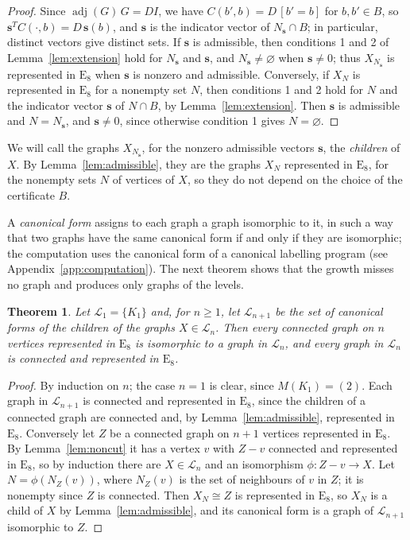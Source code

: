 \documentclass[11pt]{article}
\newcommand\cL{{\mathcal L}}
\newtheorem{theorem}{Theorem}[section]
\theoremstyle{definition}
\newcommand{\typ}[1]{\mathrm{#1}}
\newcommand\Zs{{\mathbf s}}
\begin{document}
\begin{proof}
Since $\operatorname{adj}(G)\,G=DI$, we have $C(b',b)=D\,[b'=b]$ for $b,b'\in B$, so
$\Zs^TC(\cdot,b)=D\,\Zs(b)$, and $\Zs$ is the indicator vector of $N_\Zs\cap B$; in particular,
distinct vectors give distinct sets. If $\Zs$ is admissible, then conditions 1 and 2 of
Lemma~\ref{lem:extension} hold for $N_\Zs$ and $\Zs$, and $N_\Zs\ne\varnothing$ when $\Zs\ne0$;
thus $X_{N_\Zs}$ is represented in $\typ E_8$ when $\Zs$ is nonzero and admissible. Conversely, if
$X_N$ is represented in $\typ E_8$ for a nonempty set $N$, then conditions 1 and 2 hold for $N$
and the indicator vector $\Zs$ of $N\cap B$, by Lemma~\ref{lem:extension}. Then $\Zs$ is
admissible and $N=N_\Zs$, and $\Zs\ne0$, since otherwise condition 1 gives $N=\varnothing$.
\end{proof}

We will call the graphs $X_{N_\Zs}$, for the nonzero admissible vectors $\Zs$, the
\textsl{children} of $X$. By Lemma~\ref{lem:admissible}, they are the graphs $X_N$ represented in
$\typ E_8$, for the nonempty sets $N$ of vertices of $X$, so they do not depend on the choice of
the certificate $B$.

A \textsl{canonical form} assigns to each graph a graph isomorphic to it, in such a way that two
graphs have the same canonical form if and only if they are isomorphic; the computation uses the
canonical form of a canonical labelling program (see Appendix~\ref{app:computation}). The next
theorem shows that the growth misses no graph and produces only graphs of the levels.

\begin{theorem}\label{thm:growth}
Let $\cL_1=\{K_1\}$ and, for $n\ge1$, let $\cL_{n+1}$ be the set of canonical forms of the
children of the graphs $X\in\cL_n$. Then every connected graph on $n$ vertices represented in
$\typ E_8$ is isomorphic to a graph in $\cL_n$, and every graph in $\cL_n$ is connected and
represented in $\typ E_8$.
\end{theorem}

\begin{proof}
By induction on $n$; the case $n=1$ is clear, since $M(K_1)=(2)$. Each graph in $\cL_{n+1}$ is
connected and represented in $\typ E_8$, since the children of a connected graph are connected
and, by Lemma~\ref{lem:admissible}, represented in $\typ E_8$. Conversely let $Z$ be a connected
graph on $n+1$ vertices represented in $\typ E_8$. By Lemma~\ref{lem:noncut} it has a vertex $v$
with $Z-v$ connected and represented in $\typ E_8$, so by induction there are $X\in\cL_n$ and an
isomorphism $\phi\colon Z-v\to X$. Let $N=\phi(N_Z(v))$, where $N_Z(v)$ is the set of neighbours
of $v$ in $Z$; it is nonempty since $Z$ is connected. Then $X_N\cong Z$ is represented in
$\typ E_8$, so $X_N$ is a child of $X$ by Lemma~\ref{lem:admissible}, and its canonical form is a
graph of $\cL_{n+1}$ isomorphic to $Z$.
\end{proof}
\end{document}
